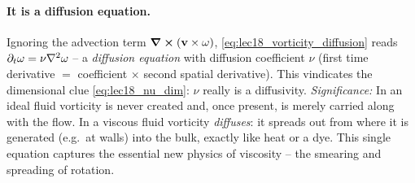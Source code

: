 \documentclass[../main.tex]{subfiles}
\begin{document}
\paragraph{It is a diffusion equation.} Ignoring the advection term $\curl(\mathbf{v}\times\mathbf{\omega})$, \eqref{eq:lec18_vorticity_diffusion} reads $\partial_t\mathbf{\omega}=\nu\nabla^2\mathbf{\omega}$ -- a \emph{diffusion equation} with diffusion coefficient $\nu$ (first time derivative $=$ coefficient $\times$ second spatial derivative). This vindicates the dimensional clue \eqref{eq:lec18_nu_dim}: $\nu$ really is a diffusivity.
\textit{Significance:} In an ideal fluid vorticity is never created and, once present, is merely carried along with the flow. In a viscous fluid vorticity \emph{diffuses}: it spreads out from where it is generated (e.g.\ at walls) into the bulk, exactly like heat or a dye. This single equation captures the essential new physics of viscosity -- the smearing and spreading of rotation.


\end{document}
